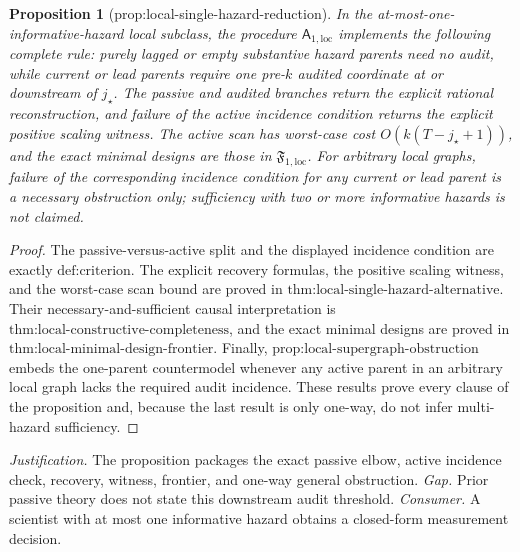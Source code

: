 \documentclass{article}
\newtheorem{proposition}{Proposition}
\begin{document}
\begin{proposition}[prop:local-single-hazard-reduction]\label{prop:local-single-hazard-reduction}
In the at-most-one-informative-hazard local subclass, the procedure
\(\mathsf A_{1,\mathrm{loc}}\) implements the following complete rule: purely lagged or empty substantive hazard parents need no audit, while current or lead parents require one pre-\(k\) audited coordinate at or downstream of
\(j_\star\).  The passive and audited branches return the explicit rational reconstruction, and failure of the active incidence condition returns the explicit positive scaling witness.  The active scan has worst-case cost
\(O(k(T-j_\star+1))\), and the exact minimal designs are those in
\(\mathfrak F_{1,\mathrm{loc}}\).  For arbitrary local graphs, failure of the corresponding incidence condition for any current or lead parent is a necessary obstruction only; sufficiency with two or more informative hazards is not claimed.
\end{proposition}
\begin{proof}
The passive-versus-active split and the displayed incidence condition are exactly \(\text{def:criterion}\).  The explicit recovery formulas, the positive scaling witness, and the worst-case scan bound are proved in
\(\text{thm:local-single-hazard-alternative}\).  Their necessary-and-sufficient causal interpretation is
\(\text{thm:local-constructive-completeness}\), and the exact minimal designs are proved in \(\text{thm:local-minimal-design-frontier}\).  Finally,
\(\text{prop:local-supergraph-obstruction}\) embeds the one-parent countermodel whenever any active parent in an arbitrary local graph lacks the required audit incidence.  These results prove every clause of the proposition and, because the last result is only one-way, do not infer multi-hazard sufficiency.
\end{proof}
\par\smallskip\noindent \textit{Justification.} The proposition packages the exact passive elbow, active incidence check, recovery, witness, frontier, and one-way general obstruction. \textit{Gap.} Prior passive theory does not state this downstream audit threshold. \textit{Consumer.} A scientist with at most one informative hazard obtains a closed-form measurement decision.
\end{document}
